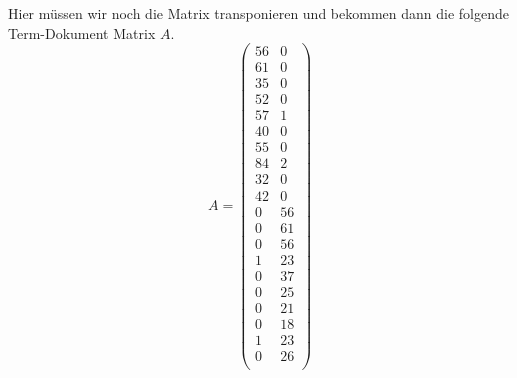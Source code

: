 \documentclass{article}
\begin{document}
Hier müssen wir noch die Matrix transponieren und bekommen dann die folgende Term-Dokument Matrix $A$.
$$A=\begin{pmatrix}
56 & 0\\
61 & 0\\
35 & 0\\
52 & 0\\
57 & 1\\
40 & 0\\
55 & 0\\
84 & 2\\
32 & 0\\
42 & 0\\
0 & 56\\
0 & 61\\
0 & 56\\
1 & 23\\
0 & 37\\
0 & 25\\
0 & 21\\
0 & 18\\
1 & 23\\
0 & 26\\
\end{pmatrix}$$
\newpage
\end{document}
